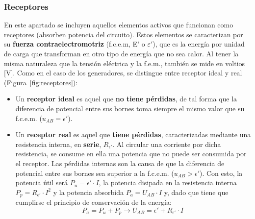	
	\subsubsection{Receptores}
	En este apartado se incluyen aquellos elementos activos que
        funcionan como receptores (absorben potencia del
        circuito). Estos elementos se caracterizan por su
        \textbf{fuerza contraelectromotriz} (f.c.e.m, E' o
        $\varepsilon'$), que es la energía por unidad de carga que
        transforman en otro tipo de energía que no sea calor. Al tener
        la misma naturaleza que la tensión eléctrica y la f.e.m.,
        también se mide en voltios [V]. Como en el caso de los
        generadores, se distingue entre receptor ideal y real
        (Figura~\ref{fig:receptores}):
	\begin{itemize}
        \item Un \textbf{receptor ideal} es aquel que \textbf{no tiene
            pérdidas}, de tal forma que la diferencia de potencial
          entre sus bornes toma siempre el mismo valor que su
          f.c.e.m. ($u_{AB}=\epsilon'$).
        \item Un \textbf{receptor real} es aquel que \textbf{tiene
            pérdidas}, caracterizadas mediante una resistencia
          interna, en \textbf{serie}, $R_{\epsilon'}$. Al circular una
          corriente por dicha resistencia, se consume en ella una
          potencia que no puede ser consumida por el receptor. Las
          pérdidas internas son la causa de que la diferencia de
          potencial entre sus bornes sea superior a la
          f.c.e.m. ($u_{AB}>\epsilon'$). Con esto, la potencia útil
          será $P_u=\epsilon'\cdot I$, la potencia disipada en la
          resistencia interna $P_p=R_{\epsilon'}\cdot I^2$ y la
          potencia absorbida $P_a=U_{AB}\cdot I$ y, dado que tiene que
          cumplirse el principio de conservación de la energía:
          \begin{equation}
            P_a=P_u+P_p\rightarrow \boxed{U_{AB}=\epsilon'+ R_{\epsilon'}\cdot I}\,
          \end{equation}
          \begin{figure}[H]
            \centering
            \hfil

\end{figure}
\end{itemize}
